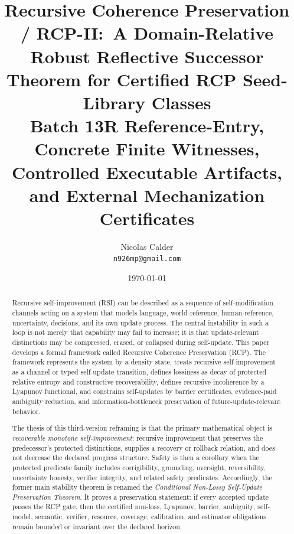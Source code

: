 \documentclass[11pt]{article}
\title{Recursive Coherence Preservation / RCP-II:\
A Domain-Relative Robust Reflective Successor Theorem for Certified RCP Seed-Library Classes\\[0.25em]
\large Batch 13R Reference-Entry, Concrete Finite Witnesses, Controlled Executable Artifacts, and External Mechanization Certificates}
\author{Nicolas Calder\\[0.25em]\small\texttt{n926mp@gmail.com}}
\date{\today}
\newcommand{\1}{\mathbf{1}}
\begin{document}
\maketitle

\begin{abstract}
Recursive self-improvement (RSI) can be described as a sequence of self-modification channels acting on a system that models language, world-reference, human-reference, uncertainty, decisions, and its own update process. The central instability in such a loop is not merely that capability may fail to increase; it is that update-relevant distinctions may be compressed, erased, or collapsed during self-update. This paper develops a formal framework called Recursive Coherence Preservation (RCP). The framework represents the system by a density state, treats recursive self-improvement as a channel or typed self-update transition, defines lossiness as decay of protected relative entropy and constructive recoverability, defines recursive incoherence by a Lyapunov functional, and constrains self-updates by barrier certificates, evidence-paid ambiguity reduction, and information-bottleneck preservation of future-update-relevant behavior.

The thesis of this third-version reframing is that the primary mathematical object is \emph{recoverable monotone self-improvement}: recursive improvement that preserves the predecessor's protected distinctions, supplies a recovery or rollback relation, and does not decrease the declared progress structure. Safety is then a corollary when the protected predicate family includes corrigibility, grounding, oversight, reversibility, uncertainty honesty, verifier integrity, and related safety predicates. Accordingly, the former main stability theorem is renamed the \emph{Conditional Non-Lossy Self-Update Preservation Theorem}. It proves a preservation statement: if every accepted update passes the RCP gate, then the certified non-loss, Lyapunov, barrier, ambiguity, self-model, semantic, verifier, resource, coverage, calibration, and estimator obligations remain bounded or invariant over the declared horizon.


\end{abstract}
\end{document}
